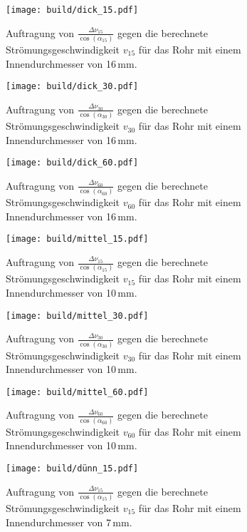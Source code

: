 \newpage
{}
\label{sec:Anhang}

\begin{figure}
  \centering
  \texttt{[image: build/dick\_15.pdf]}
  \caption{Auftragung von $\frac{\Delta \nu_{15}}{\cos(\alpha_{15})}$ gegen die berechnete
  Strömungsgeschwindigkeit $v_{15}$ für das Rohr mit einem Innendurchmesser von 16\,mm.}
  \label{fig:dick_15}
\end{figure}

\begin{figure}
  \centering
  \texttt{[image: build/dick\_30.pdf]}
  \caption{Auftragung von $\frac{\Delta \nu_{30}}{\cos(\alpha_{30})}$ gegen die berechnete
  Strömungsgeschwindigkeit $v_{30}$ für das Rohr mit einem Innendurchmesser von 16\,mm.}
  \label{fig:dick_30}
\end{figure}

\begin{figure}
  \centering
  \texttt{[image: build/dick\_60.pdf]}
  \caption{Auftragung von $\frac{\Delta \nu_{60}}{\cos(\alpha_{60})}$ gegen die berechnete
  Strömungsgeschwindigkeit $v_{60}$ für das Rohr mit einem Innendurchmesser von 16\,mm.}
  \label{fig:dick_60}
\end{figure}

\begin{figure}
  \centering
  \texttt{[image: build/mittel\_15.pdf]}
  \caption{Auftragung von $\frac{\Delta \nu_{15}}{\cos(\alpha_{15})}$ gegen die berechnete
  Strömungsgeschwindigkeit $v_{15}$ für das Rohr mit einem Innendurchmesser von 10\,mm.}
  \label{fig:mittel_15}
\end{figure}

\begin{figure}
  \centering
  \texttt{[image: build/mittel\_30.pdf]}
  \caption{Auftragung von $\frac{\Delta \nu_{30}}{\cos(\alpha_{30})}$ gegen die berechnete
  Strömungsgeschwindigkeit $v_{30}$ für das Rohr mit einem Innendurchmesser von 10\,mm.}
  \label{fig:mittel_30}
\end{figure}

\begin{figure}
  \centering
  \texttt{[image: build/mittel\_60.pdf]}
  \caption{Auftragung von $\frac{\Delta \nu_{60}}{\cos(\alpha_{60})}$ gegen die berechnete
  Strömungsgeschwindigkeit $v_{60}$ für das Rohr mit einem Innendurchmesser von 10\,mm.}
  \label{fig:mittel_60}
\end{figure}

\begin{figure}
  \centering
  \texttt{[image: build/dünn\_15.pdf]}
  \caption{Auftragung von $\frac{\Delta \nu_{15}}{\cos(\alpha_{15})}$ gegen die berechnete
  Strömungsgeschwindigkeit $v_{15}$ für das Rohr mit einem Innendurchmesser von 7\,mm.}
  \label{fig:dünn_15}
\end{figure}


